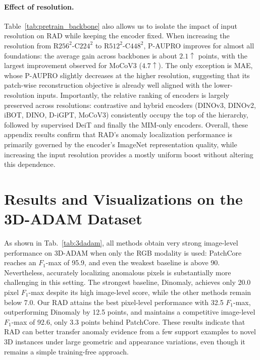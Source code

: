 \documentclass{article}
\theoremstyle{plain}
\theoremstyle{definition}
\theoremstyle{remark}
\begin{document}
\paragraph{Effect of resolution.}
Table~\ref{tab:pretrain_backbone} also allows us to isolate the impact of input resolution on RAD while keeping the encoder fixed. When increasing the resolution from R$256^2$-C$224^2$ to R$512^2$-C$448^2$, P-AUPRO improves for almost all foundations: the average gain across backbones is about $2.1\uparrow$ points, with the largest improvement observed for MoCoV3 ($4.7\uparrow$). The only exception is MAE, whose P-AUPRO slightly decreases at the higher resolution, suggesting that its patch-wise reconstruction objective is already well aligned with the lower-resolution inputs. Importantly, the relative ranking of encoders is largely preserved across resolutions: contrastive and hybrid encoders (DINOv3, DINOv2, iBOT, DINO, D-iGPT, MoCoV3) consistently occupy the top of the hierarchy, followed by supervised DeiT and finally the MIM-only encoders. Overall, these appendix results confirm that RAD's anomaly localization performance is primarily governed by the encoder's ImageNet representation quality, while increasing the input resolution provides a mostly uniform boost without altering this dependence.


\section{Results and Visualizations on the 3D-ADAM Dataset}
\label{sec:adam}



As shown in Tab.~\ref{tab:3dadam}, all methods obtain very strong image-level performance on 3D-ADAM when only the RGB modality is used: PatchCore reaches an $F_1$-max of 95.9, and even the weakest baseline is above 90. Nevertheless, accurately localizing anomalous pixels is substantially more challenging in this setting. The strongest baseline, Dinomaly, achieves only 20.0 pixel $F_1$-max despite its high image-level score, while the other methods remain below 7.0. Our RAD attains the best pixel-level performance with 32.5 $F_1$-max, outperforming Dinomaly by 12.5 points, and maintains a competitive image-level $F_1$-max of 92.6, only 3.3 points behind PatchCore. These results indicate that RAD can better transfer anomaly evidence from a few support examples to novel 3D instances under large geometric and appearance variations, even though it remains a simple training-free approach.
\end{document}
